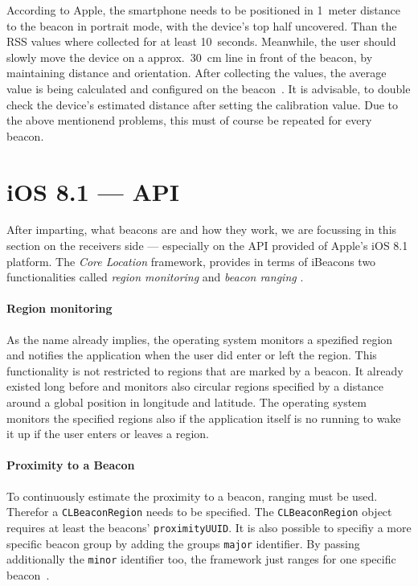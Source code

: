 According to Apple, the smartphone needs to be positioned in 1~meter distance to the beacon in portrait mode, with the device's top half uncovered.
Than the \acs{RSS} values where collected for at least 10~seconds.
Meanwhile, the user should slowly move the device on a approx.\ 30~cm line in front of the beacon, by maintaining distance and orientation.
After collecting the values, the average value is being calculated and configured on the beacon~\cite{apple:getting_started}.
It is advisable, to double check the device's estimated distance after setting the calibration value.
Due to the above mentionend problems, this must of course be repeated for every beacon.

\section{iOS 8.1 --- API}
After imparting, what beacons are and how they work, we are focussing in this section on the receivers side --- especially on the \acs{API} provided of Apple's iOS 8.1 platform.
The \textit{Core Location} framework, provides in terms of iBeacons two functionalities called \textit{region monitoring} and \textit{beacon ranging} \cite{apple:ios_doc_cl}.

\paragraph{Region monitoring} As the name already implies, the operating system monitors a spezified region and notifies the application when the user did enter or left the region.
This functionality is not restricted to regions that are marked by a beacon. It already existed long before and monitors also circular regions specified by a distance around a global position in longitude and latitude.
The operating system monitors the specified regions also if the application itself is no running to wake it up if the user enters or leaves a region.

\paragraph{Proximity to a Beacon} To continuously estimate the proximity to a beacon, ranging must be used.
Therefor a \texttt{CLBeaconRegion} needs to be specified.
The \texttt{CLBeaconRegion} object requires at least the beacons' \texttt{proximityUUID}.
It is also possible to specifiy a more specific beacon group by adding the groups  \texttt{major} identifier.
By passing additionally the \texttt{minor} identifier too, the framework just ranges for one specific beacon~\cite{apple:ios_doc_cl}.

